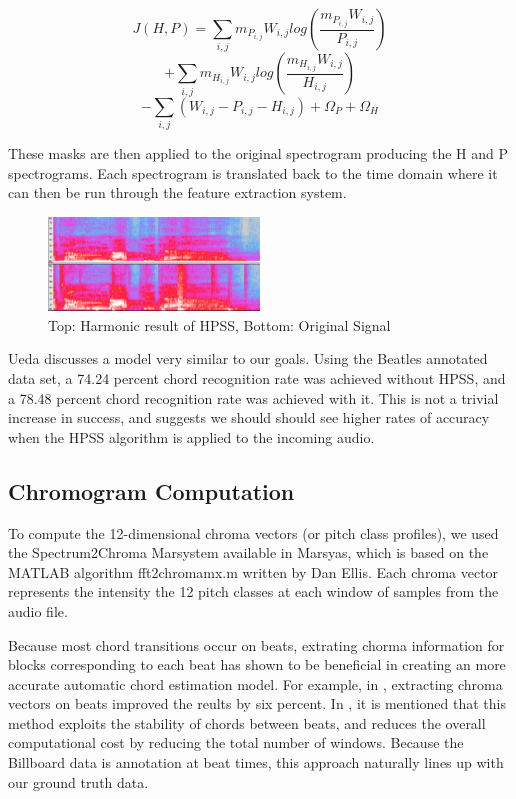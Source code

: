 \documentclass{article}
\begin{document}
$$J(H,P) = \sum_{i,j} m_{P_{i,j}} W_{i,j} log (\frac{m_{P_{i,j}} W_{i,j}}{P_{i,j}})$$
$$ + \sum_{i,j} m_{H_{i,j}} W_{i,j} log (\frac{m_{H_{i,j}} W_{i,j}}{H_{i,j}})$$
$$ - \sum_{i,j} (W_{i,j} - P_{i,j} - H_{i,j}) + \Omega_{P} + \Omega_{H}$$

These masks are then applied to the original spectrogram producing the H and P spectrograms.
Each spectrogram is translated back to the time domain where it can then be run through the
feature extraction system.

\begin{figure}
   \centering
    \includegraphics[width=0.5\textwidth]{hpssspec.png}
   \caption{Top: Harmonic result of HPSS, Bottom: Original Signal}
   \label{fig:HPSS}
\end{figure}

Ueda \cite{Ueda:19} discusses a model very similar to our goals. Using the Beatles
annotated data set, a 74.24 percent chord recognition rate was achieved without HPSS, and
a 78.48 percent chord recognition rate was achieved with it. This is not a trivial increase in
success, and suggests we should should see higher rates of accuracy when the
HPSS algorithm is applied to the incoming audio.

\subsection{Chromogram Computation}

To compute the 12-dimensional chroma vectors (or pitch class profiles), we used the
Spectrum2Chroma Marsystem available in Marsyas, which is based on the MATLAB algorithm
fft2chromamx.m written by Dan Ellis.
Each chroma vector represents the intensity the 12 pitch classes at each window of
samples from the audio file.

Because most chord transitions occur on beats, extrating chorma information for blocks corresponding
to each beat has shown to be beneficial in creating an more accurate automatic chord
estimation model. For example, in \cite{Zenz:20}, extracting chroma vectors on beats improved
the reults by six percent. In \cite{McVicor:00}, it is mentioned that this method exploits the stability
of chords between beats, and reduces the overall computational cost by reducing the total
number of windows. Because the Billboard data is annotation at beat times, this approach naturally
lines up with our ground truth data.
\end{document}
